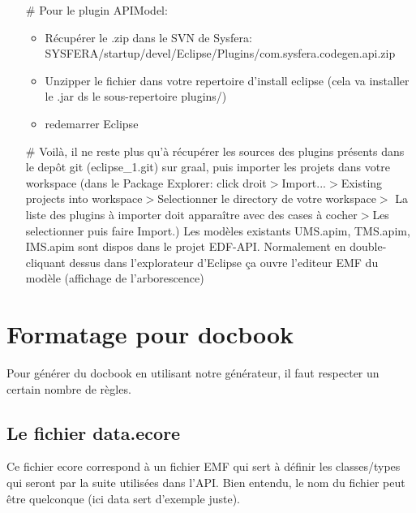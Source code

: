 \documentclass{article}
\begin{document}
\begin{itemize}
\begin{itemize}
  \item[\#] Pour le plugin APIModel:
    \begin{itemize}
      \item R\'ecup\'erer le .zip dans le SVN de Sysfera: SYSFERA/startup/devel/Eclipse\-/Plugins/com.sysfera.codegen.api.zip
      \item Unzipper le fichier dans votre repertoire d'install eclipse (cela va installer le .jar ds le sous-repertoire plugins/)
      \item redemarrer Eclipse
    \end{itemize}
  \item[\#] Voil\`a, il ne reste plus qu'\`a r\'ecup\'erer les sources des plugins présents dans le depôt git (eclipse\_1.git) sur graal, puis importer les projets dans votre workspace (dans le Package Explorer: click droit$>$Import...$>$Existing projects into workspace$>$Selectionner le directory de votre workspace$>$ La liste des plugins \`a importer doit appara\^itre avec des cases à cocher$>$Les selectionner puis faire Import.) Les mod\`eles existants UMS.apim, TMS.apim, IMS.apim sont dispos dans le projet EDF-API. Normalement en double-cliquant dessus dans l'explorateur d'Eclipse ça ouvre l'editeur EMF du modèle (affichage de l'arborescence)
  \end{itemize}
\end{itemize}

\section*{Formatage pour docbook}
Pour g\'en\'erer du docbook en utilisant notre g\'en\'erateur, il faut respecter un certain nombre de r\`egles.

\subsection*{Le fichier data.ecore}
Ce fichier ecore correspond \`a un fichier EMF qui sert \`a d\'efinir les classes/types qui seront par la suite utilis\'ees dans l'API. Bien entendu, le nom du fichier peut \^etre quelconque (ici data sert d'exemple juste).
\end{document}
